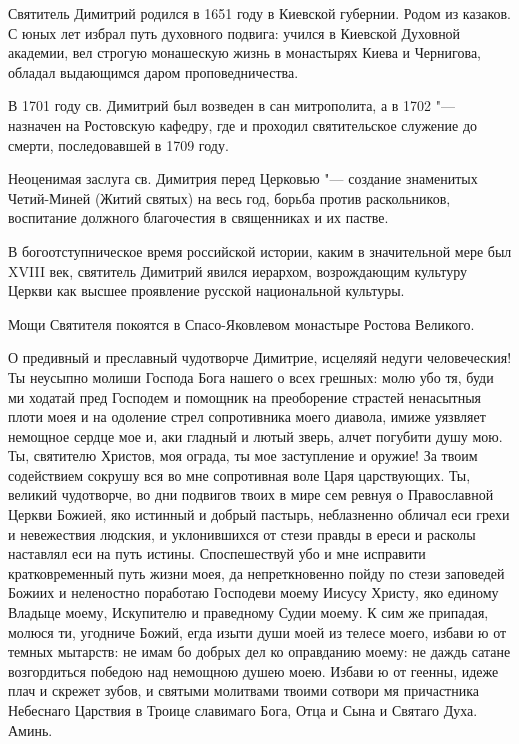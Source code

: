 \begin{mymulticols}


{\small

Святитель Димитрий родился в 1651 году в Киевской губернии. Родом из казаков. С юных лет избрал путь духовного подвига: учился в Киевской Духовной академии, вел строгую монашескую жизнь в монастырях Киева и Чернигова, обладал выдающимся даром проповедничества.


В 1701 году св. Димитрий был возведен в сан митрополита, а в 1702 "--- назначен на Ростовскую кафедру, где и проходил святительское служение до смерти, последовавшей в 1709 году.


Неоценимая заслуга св. Димитрия перед Церковью "--- создание знаменитых Четий-Миней (Житий святых) на весь год, борьба против раскольников, воспитание должного благочестия в священниках и их пастве.


В богоотступническое время российской истории, каким в значительной мере был XVIII век, святитель Димитрий явился иерархом, возрождающим культуру Церкви как высшее проявление русской национальной культуры.


Мощи Святителя покоятся в Спасо-Яковлевом монастыре Ростова Великого.

}



О предивный и преславный чудотворче Димитрие, исцеляяй недуги человеческия! Ты неусыпно молиши Господа Бога нашего о всех грешных: молю убо тя, буди ми ходатай пред Господем и помощник на преоборение страстей ненасытныя плоти моея и на одоление стрел сопротивника моего диавола, имиже уязвляет немощное сердце мое и, аки гладный и лютый зверь, алчет погубити душу мою. Ты, святителю Христов, моя ограда, ты мое заступление и оружие! За твоим содействием сокрушу вся во мне сопротивная воле Царя царствующих. Ты, великий чудотворче, во дни подвигов твоих в мире сем ревнуя о Православной Церкви Божией, яко истинный и добрый пастырь, неблазненно обличал еси грехи и невежествия людския, и уклонившихся от стези правды в ереси и расколы наставлял еси на путь истины. Споспешествуй убо и мне исправити кратковременный путь жизни моея, да непреткновенно пойду по стези заповедей Божиих и неленостно поработаю Господеви моему Иисусу Христу, яко единому Владыце моему, Искупителю и праведному Судии моему. К сим же припадая, молюся ти, угодниче Божий, егда изыти души моей из телесе моего, избави ю от темных мытарств: не имам бо добрых дел ко оправданию моему: не даждь сатане возгордиться победою над немощною душею моею. Избави ю от геенны, идеже плач и скрежет зубов, и святыми молитвами твоими сотвори мя причастника Небеснаго Царствия в Троице славимаго Бога, Отца и Сына и Святаго Духа. Аминь.

\end{mymulticols}

